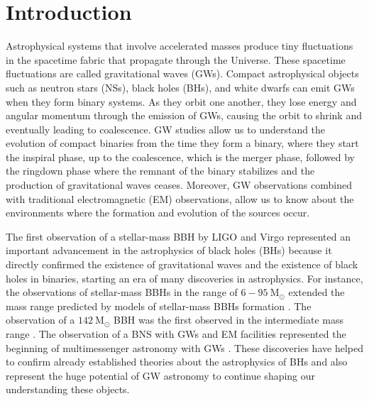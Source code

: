 \documentclass[a4paper,12pt]{article}
\author{José Carlos González Martínez}
\date{May 2025}
\begin{document}


\tableofcontents
\clearpage

\section{Introduction}
\label{sec:intro}

Astrophysical systems that involve accelerated masses produce tiny fluctuations in the spacetime fabric that propagate through the Universe. These spacetime fluctuations are called gravitational waves (GWs). Compact astrophysical objects such as neutron stars (NSs), black holes (BHs), and white dwarfs can emit GWs when they form binary systems. As they orbit one another, they lose energy and angular momentum through the emission of GWs, causing the orbit to shrink and eventually leading to coalescence. GW studies allow us to understand the evolution of compact binaries from the time they form a binary, where they start the inspiral phase, up to the coalescence, which is the merger phase, followed by the ringdown phase where the remnant of the binary stabilizes and the production of gravitational waves ceases. Moreover, GW observations combined with traditional electromagnetic (EM) observations, allow us to know about the environments where the formation and evolution of the sources occur. 

The first observation of a stellar-mass BBH by LIGO and Virgo \cite{abbott2016observation} represented an important advancement in the astrophysics of black holes (BHs) because it directly confirmed the existence of gravitational waves and the existence of black holes in binaries, starting an era of many discoveries in astrophysics. For instance, the observations of stellar-mass BBHs in the range of $6-95~\mathrm{M}_{\odot}$ extended the mass range predicted by models of stellar-mass BBHs formation \cite{abbott2021gwtc}. The observation of a $142~\mathrm{M}_{\odot}$ BBH was the first observed in the intermediate mass range \cite{abbott2020gw190521}. The observation of a BNS with GWs and EM facilities represented the beginning of multimessenger astronomy with GWs \cite{abbott2017gw170817}. These discoveries have helped to confirm already established theories about the astrophysics of BHs and also represent the huge potential of GW astronomy to continue shaping our understanding these objects.
\end{document}
